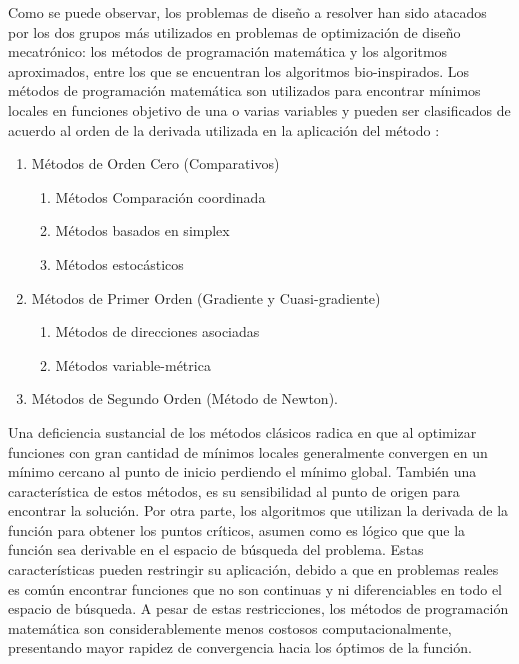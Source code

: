   Como se puede observar, los problemas de diseño a resolver han sido atacados por los dos grupos más utilizados en problemas de optimización de diseño mecatrónico: los métodos de programación matemática y los algoritmos aproximados, entre los que se encuentran los algoritmos bio-inspirados. Los métodos de programación matemática son utilizados para encontrar mínimos locales en funciones objetivo de una o varias variables y pueden ser clasificados de acuerdo al orden de la derivada utilizada en la aplicación del método \cite{bishop_mechatronics_2002}:
  \begin{enumerate}
  	\item Métodos de Orden Cero (Comparativos)
  	\begin{enumerate}
  		\item Métodos Comparación coordinada
  		\item Métodos basados en simplex
  		\item Métodos estocásticos  
  	\end{enumerate}
  	\item Métodos de Primer Orden (Gradiente y Cuasi-gradiente)
  	\begin{enumerate}
  		\item Métodos de direcciones asociadas
  		\item Métodos variable-métrica 
  	\end{enumerate}
  	\item Métodos de Segundo Orden (Método de Newton).
  \end{enumerate}
  Una deficiencia sustancial de los métodos clásicos radica en que al optimizar funciones con gran cantidad de mínimos locales generalmente convergen en un mínimo cercano al punto de inicio perdiendo el mínimo global. También una característica de estos métodos, es su sensibilidad al punto de origen para encontrar la solución. Por otra parte, los algoritmos que utilizan la derivada de la función para obtener los puntos críticos, asumen como es lógico que que la función sea derivable en el espacio de búsqueda del problema. Estas características pueden restringir su aplicación, debido a que en problemas reales es común encontrar funciones que no son continuas y ni diferenciables en todo el espacio de búsqueda. A pesar de estas restricciones, los métodos de programación matemática son considerablemente menos costosos computacionalmente, presentando mayor rapidez de convergencia hacia los óptimos de la función.
    
